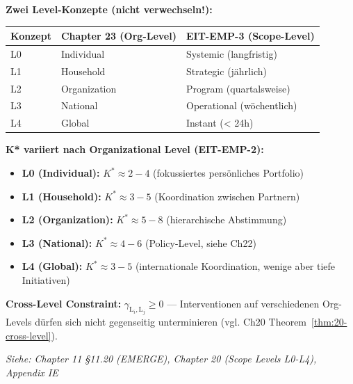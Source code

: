 \begin{tcolorbox}[colback=blue!5!white, colframe=blue!75!black,
    title=\textbf{Cross-Reference: EMERGE Algorithm \& Multi-Level K* (Chapter 11, 20)}]

\textbf{Zwei Level-Konzepte (nicht verwechseln!):}
\begin{center}
\small
\begin{tabular}{@{}lll@{}}
\textbf{Konzept} & \textbf{Chapter 23 (Org-Level)} & \textbf{EIT-EMP-3 (Scope-Level)} \\
\hline
L0 & Individual & Systemic (langfristig) \\
L1 & Household & Strategic (jährlich) \\
L2 & Organization & Program (quartalsweise) \\
L3 & National & Operational (wöchentlich) \\
L4 & Global & Instant (< 24h) \\
\end{tabular}
\end{center}

\textbf{K* variiert nach Organizational Level (EIT-EMP-2):}
\begin{itemize}[nosep]
\item \textbf{L0 (Individual):} $K^* \approx 2-4$ (fokussiertes persönliches Portfolio)
\item \textbf{L1 (Household):} $K^* \approx 3-5$ (Koordination zwischen Partnern)
\item \textbf{L2 (Organization):} $K^* \approx 5-8$ (hierarchische Abstimmung)
\item \textbf{L3 (National):} $K^* \approx 4-6$ (Policy-Level, siehe Ch22)
\item \textbf{L4 (Global):} $K^* \approx 3-5$ (internationale Koordination, wenige aber tiefe Initiativen)
\end{itemize}

\textbf{Cross-Level Constraint:} $\gamma_{\text{L}_i, \text{L}_j} \geq 0$ --- Interventionen auf verschiedenen Org-Levels dürfen sich nicht gegenseitig unterminieren (vgl. Ch20 Theorem~\ref{thm:20-cross-level}).

\vspace{0.2cm}
\textit{Siehe: Chapter 11 §11.20 (EMERGE), Chapter 20 (Scope Levels L0-L4), Appendix IE}
\end{tcolorbox}

